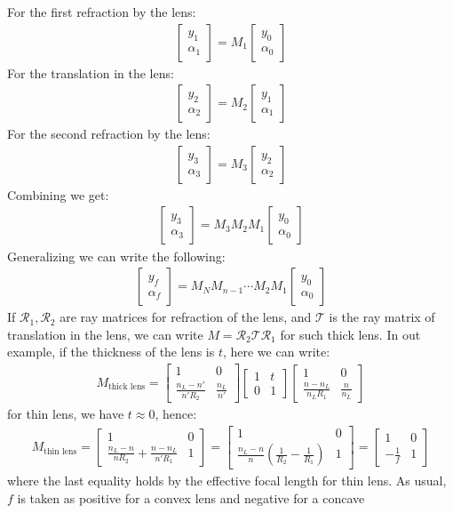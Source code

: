 \documentclass[11pt]{book}
\theoremstyle{break}
\theoremstyle{break}
\newcommand{\bmat}[1]{\begin{bmatrix} #1 \end{bmatrix}}
\begin{document}
For the first refraction by the lens:
\begin{align*}
\bmat{y_1 \\\alpha_1} = M_1 \bmat{y_0 \\ \alpha_0}   
\end{align*}
For the translation in the lens:
\begin{align*}
\bmat{y_2 \\ \alpha_2} = M_2 \bmat{y_1 \\ \alpha_1 } 
\end{align*}
For the second refraction by the lens:
\begin{align*}
\bmat{y_3 \\ \alpha_3} = M_3 \bmat{y_2 \\ \alpha_2}
\end{align*}
Combining we get:
\begin{align*}
\bmat{y_3 \\ \alpha_3} = M_3M_2M_1 \bmat{y_0 \\ \alpha_0}
\end{align*}
Generalizing we can write the following:
\begin{align*}
\bmat{y_f \\ \alpha_f} = M_N M_{n-1} \cdots M_2 M_1 \bmat{y_0 \\ \alpha_0}
\end{align*}
If $\mathcal{R}_1, \mathcal{R}_2$ are ray matrices for refraction of the lens, and $\mathcal{T}$ is the ray matrix of translation in the lens, we can write $M = \mathcal{R}_2 \mathcal{T} \mathcal{R}_1$ for such thick lens. In out example, if the thickness of the lens is $t$, here we can write:
\begin{align*}
M_{\text{thick lens}} = \bmat{1 & 0 \\ \frac{n_L - n'}{n' R_2} & \frac{n_L }{n'}} \bmat{1 & t\\ 0 & 1}\bmat{1 & 0 \\ \frac{n-n_L}{n_LR_1} & \frac{n}{n_L}}
\end{align*}
for thin lens, we have $t \approx 0$, hence:
\begin{align*}
M_{\text{thin lens}} = \bmat{1& 0 \\ \frac{n_L-n}{nR_2} + \frac{n- n_L}{n'R_1}& 1} = \bmat{1 & 0 \\ \frac{n_L - n}{n}\left( \frac{1}{R_2} - \frac{1}{R_1}\right) & 1} = \bmat{1& 0 \\ -\frac{1}{f} & 1}
\end{align*}
where the last equality holds by the effective focal length for thin lens. As usual, $f$ is taken as positive for a convex lens and negative for a concave
\end{document}
